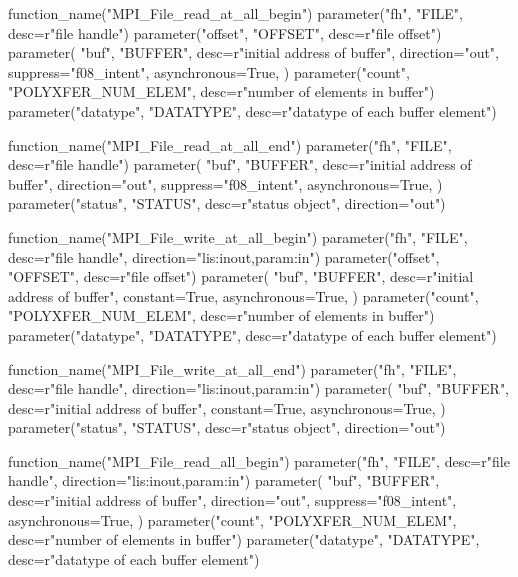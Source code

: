 %
%
\begin{mpi-binding}
    function_name("MPI_File_read_at_all_begin")
    parameter("fh", "FILE", desc=r"file handle")
    parameter("offset", "OFFSET", desc=r"file offset")
    parameter(
        "buf",
        "BUFFER",
        desc=r"initial address of buffer",
        direction="out",
        suppress="f08_intent",
        asynchronous=True,
    )
    parameter("count", "POLYXFER_NUM_ELEM", desc=r"number of elements in buffer")
    parameter("datatype", "DATATYPE", desc=r"datatype of each buffer element")
\end{mpi-binding}

%
%
\begin{mpi-binding}
    function_name("MPI_File_read_at_all_end")
    parameter("fh", "FILE", desc=r"file handle")
    parameter(
        "buf",
        "BUFFER",
        desc=r"initial address of buffer",
        direction="out",
        suppress="f08_intent",
        asynchronous=True,
    )
    parameter("status", "STATUS", desc=r"status object", direction="out")
\end{mpi-binding}

%
%
\begin{mpi-binding}
    function_name("MPI_File_write_at_all_begin")
    parameter("fh", "FILE", desc=r"file handle", direction="lis:inout,param:in")
    parameter("offset", "OFFSET", desc=r"file offset")
    parameter(
        "buf",
        "BUFFER",
        desc=r"initial address of buffer",
        constant=True,
        asynchronous=True,
    )
    parameter("count", "POLYXFER_NUM_ELEM", desc=r"number of elements in buffer")
    parameter("datatype", "DATATYPE", desc=r"datatype of each buffer element")
\end{mpi-binding}

%
%
\begin{mpi-binding}
    function_name("MPI_File_write_at_all_end")
    parameter("fh", "FILE", desc=r"file handle", direction="lis:inout,param:in")
    parameter(
        "buf",
        "BUFFER",
        desc=r"initial address of buffer",
        constant=True,
        asynchronous=True,
    )
    parameter("status", "STATUS", desc=r"status object", direction="out")
\end{mpi-binding}


%
\begin{mpi-binding}
    function_name("MPI_File_read_all_begin")
    parameter("fh", "FILE", desc=r"file handle", direction="lis:inout,param:in")
    parameter(
        "buf",
        "BUFFER",
        desc=r"initial address of buffer",
        direction="out",
        suppress="f08_intent",
        asynchronous=True,
    )
    parameter("count", "POLYXFER_NUM_ELEM", desc=r"number of elements in buffer")
    parameter("datatype", "DATATYPE", desc=r"datatype of each buffer element")
\end{mpi-binding}

